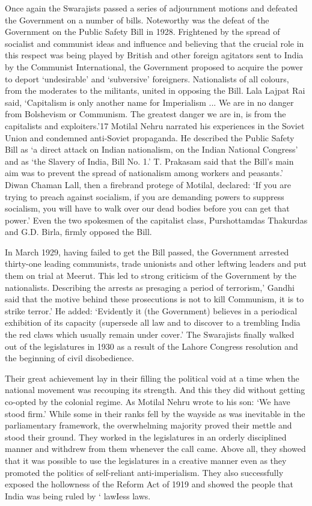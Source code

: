 Once again the Swarajists passed a series of adjournment motions and defeated the Government on a number of bills. Noteworthy was the defeat of the Government on the Public Safety Bill in 1928. Frightened by the spread of socialist and communist ideas and influence and believing that the crucial role in this respect was being played by British and other foreign agitators sent to India by the Communist International, the Government proposed to acquire the power to deport `undesirable' and `subversive' foreigners. Nationalists of all colours, from the moderates to the militants, united in opposing the Bill. Lala Lajpat Rai said, `Capitalism is only another name for Imperialism ... We are in no danger from Bolshevism or Communism. The greatest danger we are in, is from the capitalists and exploiters.'17 Motilal Nehru narrated his experiences in the Soviet Union and condemned anti-Soviet propaganda. He described the Public Safety Bill as `a direct attack on Indian nationalism, on the Indian National Congress' and as `the Slavery of India, Bill No. 1.' T. Prakasam said that the Bill's main aim was to prevent the spread of nationalism among workers and peasants.' Diwan Chaman Lall, then a firebrand protege of Motilal, declared: `If you are trying to preach against socialism, if you are demanding powers to suppress socialism, you will have to walk over our dead bodies before you can get that power.' Even the two spokesmen of the capitalist class, Purshottamdas Thakurdas and G.D. Birla, firmly opposed the Bill.

In March 1929, having failed to get the Bill passed, the Government arrested thirty-one leading communists, trade unionists and other leftwing leaders and put them on trial at Meerut. This led to strong criticism of the Government by the nationalists. Describing the arrests as presaging a period of terrorism,' Gandhi said that the motive behind these prosecutions is not to kill Communism, it is to strike terror.' He added: `Evidently it (the Government) believes in a periodical exhibition of its capacity (supersede all law and to discover to a trembling India the red claws which usually remain under cover.' The Swarajists finally walked out of the legislatures in 1930 as a result of the Lahore Congress resolution and the beginning of civil disobedience.

Their great achievement lay in their filling the political void at a time when the national movement was recouping its strength. And this they did without getting co-opted by the colonial regime. As Motilal Nehru wrote to his son: `We have stood firm.' While some in their ranks fell by the wayside as was inevitable in the parliamentary framework, the overwhelming majority proved their mettle and stood their ground. They worked in the legislatures in an orderly disciplined manner and withdrew from them whenever the call came. Above all, they showed that it was possible to use the legislatures in a creative manner even as they promoted the politics of self-reliant anti-imperialism. They also successfully exposed the hollowness of the Reform Act of 1919 and showed the people that India was being ruled by ` lawIess laws.

